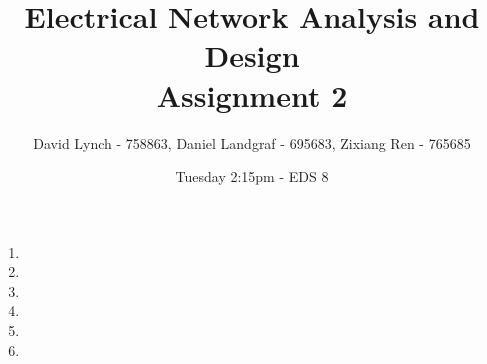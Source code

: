 \documentclass[10pt,a4paper]{article}
\author{David Lynch - 758863, Daniel Landgraf - 695683, Zixiang Ren - 765685}
\title{\huge{Electrical Network Analysis and Design} \\ Assignment 2}
\date{\small{Tuesday 2:15pm - EDS 8}}
\begin{document}
\maketitle

	\begin{enumerate}
		\item{
		\let\clearpage\relax
		
		}
		\item{
		\let\clearpage\relax
		
		}
		\item{
		\let\clearpage\relax
		
		}
		\item{
		\let\clearpage\relax
		
		}
		\item{
		\let\clearpage\relax
		
		}
		\item{
		\let\clearpage\relax
		
		}
	\end{enumerate}
\end{document}
